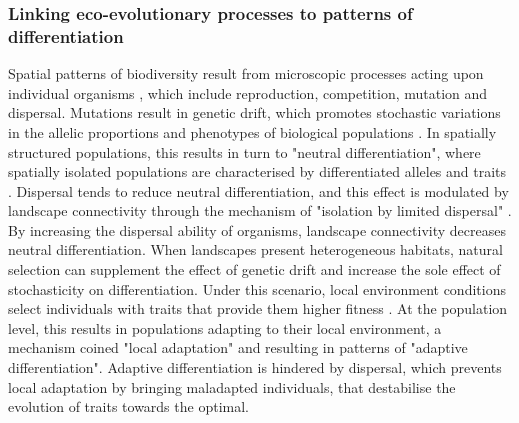 \subsubsection{Linking eco-evolutionary processes to patterns of differentiation}
Spatial patterns of biodiversity result from microscopic processes acting upon individual organisms \cite{Champagnat2006}, which include reproduction, competition, mutation and dispersal.
% 
Mutations result in genetic drift, which promotes stochastic variations in the allelic proportions and phenotypes of biological populations \cite{XXX}. In spatially structured populations, this results in turn to "neutral differentiation", where spatially isolated populations are characterised by differentiated alleles and traits \cite{XXX}. 
% 
Dispersal tends to reduce neutral differentiation, and this effect is modulated by landscape connectivity \cite{Wright1943,McRae2006,McRae2007} through the mechanism of "isolation by limited dispersal" \cite{Orsini2013}. By increasing the dispersal ability of organisms, landscape connectivity decreases neutral differentiation.
% 
When landscapes present heterogeneous habitats, natural selection can supplement the effect of genetic drift and increase the sole effect of stochasticity on differentiation. Under this scenario, local environment conditions select individuals with traits that provide them higher fitness \cite{XXX}. At the population level, this results in populations adapting to their local environment, a mechanism coined "local adaptation" \cite{Kawecki2004} and resulting in patterns of "adaptive differentiation". 
% 
% 
Adaptive differentiation is hindered by dispersal, which prevents local adaptation by bringing maladapted individuals, that destabilise the evolution of traits towards the optimal.
% 
% 
